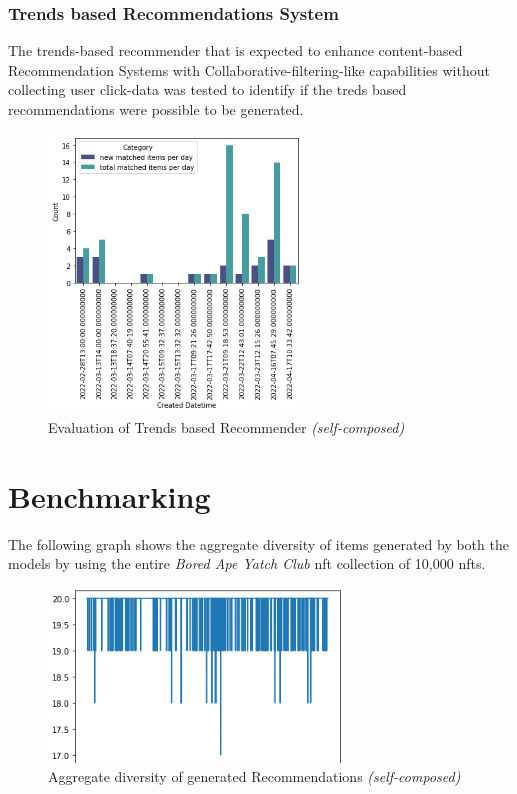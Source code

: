 \subsubsection{Trends based Recommendations System}


The trends-based recommender that is expected to enhance content-based Recommendation Systems with Collaborative-filtering-like capabilities without collecting user click-data was tested to identify if the treds based recommendations were possible to be generated.


\begin{figure}[h!]
\centering
\includegraphics[width=0.6\textwidth]{images/Testing/trends-matches-eval1.png}
\caption{Evaluation of Trends based Recommender \textit{(self-composed)}}
\label{fig:trends-recsys-new-matches}
\end{figure}


\section{Benchmarking}
\label{sec:test-benchmarking}

The following graph shows the aggregate diversity of items generated by both the models by using the entire \textit{Bored Ape Yatch Club} \gls{nft} collection of 10,000 \gls{nft}s.

\begin{figure}[h!]
\centering
\includegraphics[width=0.7\textwidth]{images/Testing/aggregate diversity.png}
\caption{Aggregate diversity of generated Recommendations \textit{(self-composed)}}
\label{fig:aggregate-diversity-traits}
\end{figure}

